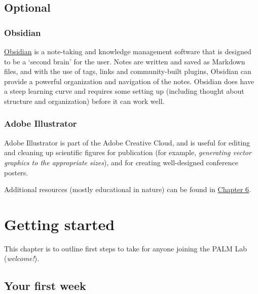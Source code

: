 \documentclass[
]{book}
\begin{document}
\hypertarget{optional}{%
\section{Optional}\label{optional}}

\hypertarget{obsidian}{%
\subsection*{Obsidian}\label{obsidian}}

\href{https://obsidian.md/}{Obsidian} is a note-taking and knowledge management software that is designed to be a `second brain' for the user. Notes are written and saved as Markdown files, and with the use of tags, links and community-built plugins, Obsidian can provide a powerful organization and navigation of the notes. Obsidian does have a steep learning curve and requires some setting up (including thought about structure and organization) before it can work well.

\hypertarget{adobe-illustrator}{%
\subsection*{Adobe Illustrator}\label{adobe-illustrator}}

Adobe Illustrator is part of the Adobe Creative Cloud, and is useful for editing and cleaning up scientific figures for publication (for example, \emph{generating vector graphics to the appropriate sizes}), and for creating well-designed conference posters.

Additional resources (mostly educational in nature) can be found in \protect\hyperlink{extra-resources}{Chapter 6}.

\hypertarget{getting-started}{%
\chapter{Getting started}\label{getting-started}}

This chapter is to outline first steps to take for anyone joining the PALM Lab (\emph{welcome!}).

\hypertarget{your-first-week}{%
\section{Your first week}\label{your-first-week}}
\end{document}
